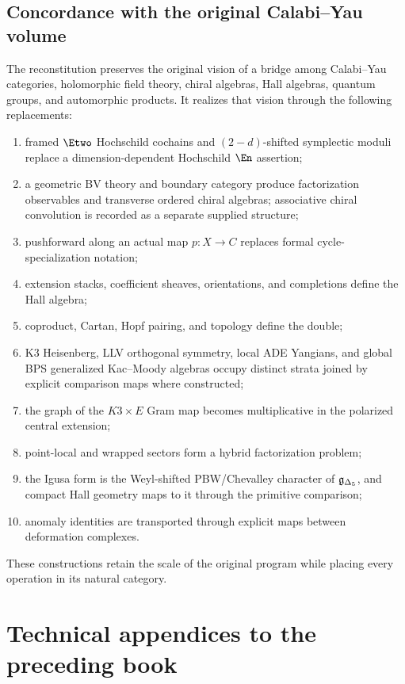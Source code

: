 \chapter{Concordance with the original Calabi--Yau volume}
The reconstitution preserves the original vision of a bridge among Calabi--Yau categories, holomorphic field theory, chiral algebras, Hall algebras, quantum groups, and automorphic products. It realizes that vision through the following replacements:
\begin{enumerate}
\item framed $\Etwo$ Hochschild cochains and $(2-d)$-shifted symplectic moduli replace a dimension-dependent Hochschild $\En$ assertion;
\item a geometric BV theory and boundary category produce factorization observables and transverse ordered chiral algebras; associative chiral convolution is recorded as a separate supplied structure;
\item pushforward along an actual map $p:X\to C$ replaces formal cycle-specialization notation;
\item extension stacks, coefficient sheaves, orientations, and completions define the Hall algebra;
\item coproduct, Cartan, Hopf pairing, and topology define the double;
\item K3 Heisenberg, LLV orthogonal symmetry, local ADE Yangians, and global BPS generalized Kac--Moody algebras occupy distinct strata joined by explicit comparison maps where constructed;
\item the graph of the $K3\times E$ Gram map becomes multiplicative in the polarized central extension;
\item point-local and wrapped sectors form a hybrid factorization problem;
\item the Igusa form is the Weyl-shifted PBW/Chevalley character of ${\mathfrak g_{\Delta_5}}$, and compact Hall geometry maps to it through the primitive comparison;
\item anomaly identities are transported through explicit maps between deformation complexes.
\end{enumerate}
These constructions retain the scale of the original program while placing every operation in its natural category.

\part{Technical appendices to the preceding book}
